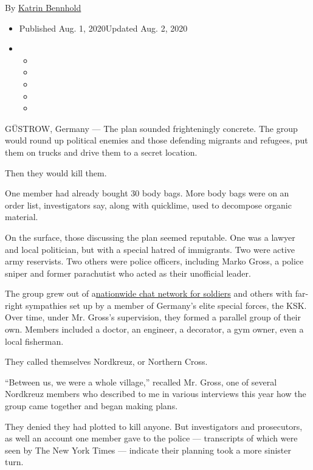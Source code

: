 By \href{https://www.nytimes3xbfgragh.onion/by/katrin-bennhold}{Katrin
Bennhold}

\begin{itemize}
\item
  Published Aug. 1, 2020Updated Aug. 2, 2020
\item
  \begin{itemize}
  \item
  \item
  \item
  \item
  \item
  \end{itemize}
\end{itemize}

GÜSTROW, Germany --- The plan sounded frighteningly concrete. The group
would round up political enemies and those defending migrants and
refugees, put them on trucks and drive them to a secret location.

Then they would kill them.

One member had already bought 30 body bags. More body bags were on an
order list, investigators say, along with quicklime, used to decompose
organic material.

On the surface, those discussing the plan seemed reputable. One was a
lawyer and local politician, but with a special hatred of immigrants.
Two were active army reservists. Two others were police officers,
including Marko Gross, a police sniper and former parachutist who acted
as their unofficial leader.

The group grew out of
a\href{https://www.nytimes3xbfgragh.onion/2020/07/03/world/europe/germany-military-neo-nazis-ksk.html?searchResultPosition=2}{nationwide
chat network for soldiers} and others with far-right sympathies set up
by a member of Germany's elite special forces, the KSK. Over time, under
Mr. Gross's supervision, they formed a parallel group of their own.
Members included a doctor, an engineer, a decorator, a gym owner, even a
local fisherman.

They called themselves Nordkreuz, or Northern Cross.

``Between us, we were a whole village,'' recalled Mr. Gross, one of
several Nordkreuz members who described to me in various interviews this
year how the group came together and began making plans.

They denied they had plotted to kill anyone. But investigators and
prosecutors, as well an account one member gave to the police ---
transcripts of which were seen by The New York Times --- indicate their
planning took a more sinister turn.

